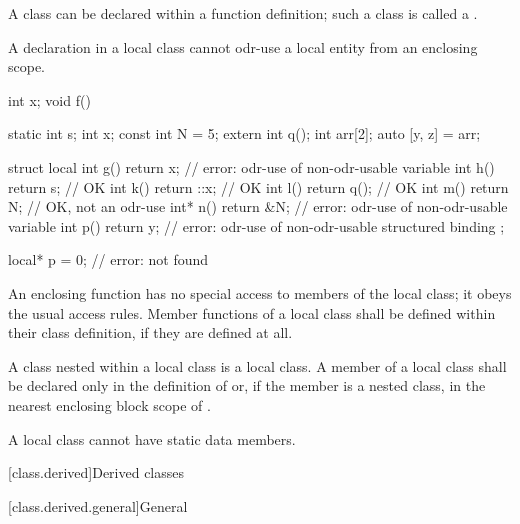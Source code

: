 \pnum
A class can be declared within a function definition; such a class is
called a .
\begin{note}
A declaration in a local class
cannot odr-use
a local entity
from an
enclosing scope.
\end{note}
\begin{example}
\begin{codeblock}
int x;
void f() {
  static int s;
  int x;
  const int N = 5;
  extern int q();
  int arr[2];
  auto [y, z] = arr;

  struct local {
    int g() { return x; }       // error: odr-use of non-odr-usable variable 
    int h() { return s; }       // OK
    int k() { return ::x; }     // OK
    int l() { return q(); }     // OK
    int m() { return N; }       // OK, not an odr-use
    int* n() { return &N; }     // error: odr-use of non-odr-usable variable 
    int p() { return y; }       // error: odr-use of non-odr-usable structured binding 
  };
}

local* p = 0;                   // error:  not found
\end{codeblock}
\end{example}

\pnum
An enclosing function has no special access to members of the local
class; it obeys the usual access rules.
%
Member functions of a local class shall be defined within their class
definition, if they are defined at all.

\pnum
{}%
%
A class nested within
a local class is a local class.
A member of a local class  shall be
declared only in the definition of  or,
if the member is a nested class,
in the nearest enclosing block scope of .

\pnum
{}%
\begin{note}
A local class cannot have static data members.
\end{note}

[class.derived]{Derived classes}%

[class.derived.general]{General}%


